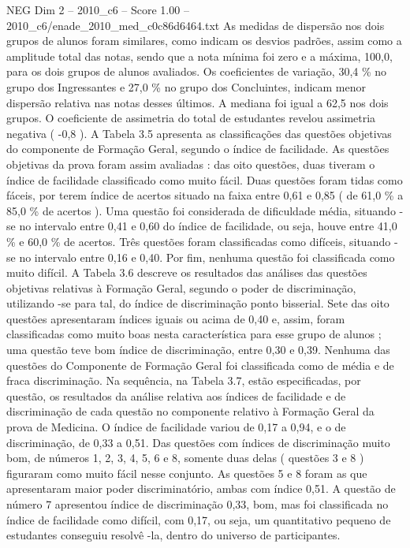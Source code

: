 \begin{textsample}{NEG Dim 2 – 2010\_c6 – Score 1.00 – 2010\_c6/enade\_2010\_med\_c0c86d6464.txt}
As medidas de dispersão nos dois grupos de alunos foram similares, como indicam os desvios padrões, assim como a amplitude total das notas, sendo que a nota mínima foi zero e a máxima, 100,0, para os dois grupos de alunos avaliados.
Os coeficientes de variação, 30,4 \% no grupo dos Ingressantes e 27,0 \% no grupo dos Concluintes, indicam menor dispersão relativa nas notas desses últimos.
A mediana foi igual a 62,5 nos dois grupos.
O coeficiente de assimetria do total de estudantes revelou assimetria negativa ( -0,8 ).
A Tabela 3.5 apresenta as classificações das questões objetivas do componente de Formação Geral, segundo o índice de facilidade.
As questões objetivas da prova foram assim avaliadas : das oito questões, duas tiveram o índice de facilidade classificado como muito fácil.
Duas questões foram tidas como fáceis, por terem índice de acertos situado na faixa entre 0,61 e 0,85 ( de 61,0 \% a 85,0 \% de acertos ).
Uma questão foi considerada de dificuldade média, situando -se no intervalo entre 0,41 e 0,60 do índice de facilidade, ou seja, houve entre 41,0 \% e 60,0 \% de acertos.
Três questões foram classificadas como difíceis, situando -se no intervalo entre 0,16 e 0,40.
Por fim, nenhuma questão foi classificada como muito difícil.
A Tabela 3.6 descreve os resultados das análises das questões objetivas relativas à Formação Geral, segundo o poder de discriminação, utilizando -se para tal, do índice de discriminação ponto bisserial.
Sete das oito questões apresentaram índices iguais ou acima de 0,40 e, assim, foram classificadas como muito boas nesta característica para esse grupo de alunos ; uma questão teve bom índice de discriminação, entre 0,30 e 0,39.
Nenhuma das questões do Componente de Formação Geral foi classificada como de média e de fraca discriminação.
Na sequência, na Tabela 3.7, estão especificadas, por questão, os resultados da análise relativa aos índices de facilidade e de discriminação de cada questão no componente relativo à Formação Geral da prova de Medicina.
O índice de facilidade variou de 0,17 a 0,94, e o de discriminação, de 0,33 a 0,51.
Das questões com índices de discriminação muito bom, de números 1, 2, 3, 4, 5, 6 e 8, somente duas delas ( questões 3 e 8 ) figuraram como muito fácil nesse conjunto.
As questões 5 e 8 foram as que apresentaram maior poder discriminatório, ambas com índice 0,51.
A questão de número 7 apresentou índice de discriminação 0,33, bom, mas foi classificada no índice de facilidade como difícil, com 0,17, ou seja, um quantitativo pequeno de estudantes conseguiu resolvê -la, dentro do universo de participantes.

\end{textsample}
